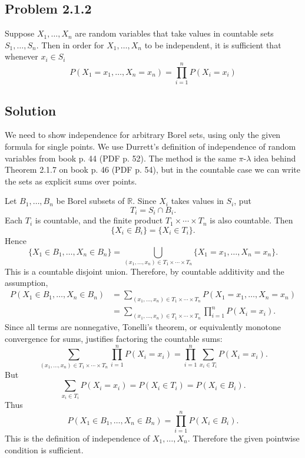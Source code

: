 \documentclass[a4paper,12pt,openany]{article}
\theoremstyle{plain}
\theoremstyle{definition}
\begin{document}
\subsection*{Problem 2.1.2}

Suppose $X_1,\ldots,X_n$ are random variables that take values in countable sets $S_1,\ldots,S_n$. Then in order for $X_1,\ldots,X_n$ to be independent, it is sufficient that whenever $x_i \in S_i$
\[
P(X_1 = x_1,\ldots,X_n = x_n)
= \prod_{i=1}^n P(X_i = x_i)
\]

\subsection*{Solution}

We need to show independence for arbitrary Borel sets, using only the given formula for single points. We use Durrett's definition of independence of random variables from book p. 44 (PDF p. 52). The method is the same $\pi$-$\lambda$ idea behind Theorem 2.1.7 on book p. 46 (PDF p. 54), but in the countable case we can write the sets as explicit sums over points.

\medskip

Let $B_1,\ldots,B_n$ be Borel subsets of $\mathbb{R}$. Since $X_i$ takes values in $S_i$, put
\[
T_i=S_i\cap B_i.
\]
Each $T_i$ is countable, and the finite product $T_1\times\cdots\times T_n$ is also countable.
Then
\[
\{X_i\in B_i\}=\{X_i\in T_i\}.
\]
Hence
\[
\{X_1\in B_1,\ldots,X_n\in B_n\}
=
\bigcup_{(x_1,\ldots,x_n)\in T_1\times\cdots\times T_n}
\{X_1=x_1,\ldots,X_n=x_n\}.
\]
This is a countable disjoint union. Therefore, by countable additivity and the assumption,
\[
\begin{aligned}
P(X_1\in B_1,\ldots,X_n\in B_n)
&=
\sum_{(x_1,\ldots,x_n)\in T_1\times\cdots\times T_n}
P(X_1=x_1,\ldots,X_n=x_n)\\
&=
\sum_{(x_1,\ldots,x_n)\in T_1\times\cdots\times T_n}
\prod_{i=1}^n P(X_i=x_i).
\end{aligned}
\]
Since all terms are nonnegative, Tonelli's theorem, or equivalently monotone convergence for sums, justifies factoring the countable sums:
\[
\sum_{(x_1,\ldots,x_n)\in T_1\times\cdots\times T_n}
\prod_{i=1}^n P(X_i=x_i)
=
\prod_{i=1}^n \sum_{x_i\in T_i}P(X_i=x_i).
\]
But
\[
\sum_{x_i\in T_i}P(X_i=x_i)
=
P(X_i\in T_i)
=
P(X_i\in B_i).
\]
Thus
\[
P(X_1\in B_1,\ldots,X_n\in B_n)
=
\prod_{i=1}^n P(X_i\in B_i).
\]
This is the definition of independence of $X_1,\ldots,X_n$. Therefore the given pointwise condition is sufficient.
\end{document}
